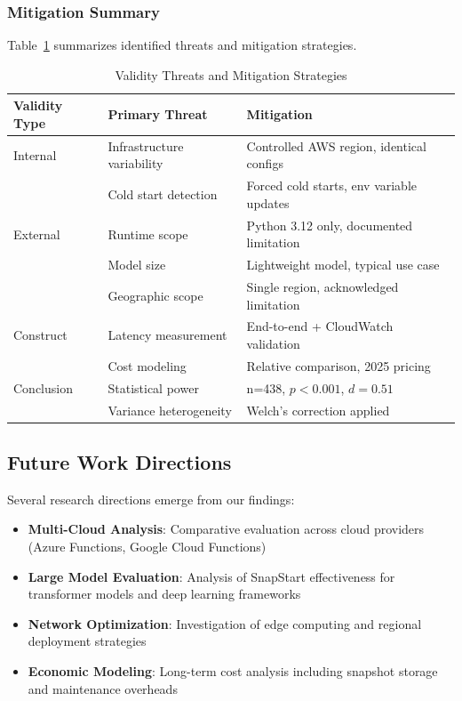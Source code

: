 \documentclass[conference]{IEEEtran}
\begin{document}
\subsubsection{Mitigation Summary}
Table~\ref{tab:validity_threats} summarizes identified threats and mitigation strategies.

\begin{table}[h]
\caption{Validity Threats and Mitigation Strategies}
\label{tab:validity_threats}
\centering
\small
\begin{tabular}{p{2cm}p{2.5cm}p{2cm}}
\toprule
\textbf{Validity Type} & \textbf{Primary Threat} & \textbf{Mitigation} \\
\midrule
Internal & Infrastructure variability & Controlled AWS region, identical configs \\
& Cold start detection & Forced cold starts, env variable updates \\
\midrule
External & Runtime scope & Python 3.12 only, documented limitation \\
& Model size & Lightweight model, typical use case \\
& Geographic scope & Single region, acknowledged limitation \\
\midrule
Construct & Latency measurement & End-to-end + CloudWatch validation \\
& Cost modeling & Relative comparison, 2025 pricing \\
\midrule
Conclusion & Statistical power & n=438, $p<0.001$, $d=0.51$ \\
& Variance heterogeneity & Welch's correction applied \\
\bottomrule
\end{tabular}
\end{table}

\subsection{Future Work Directions}
Several research directions emerge from our findings:

\begin{itemize}
\item \textbf{Multi-Cloud Analysis}: Comparative evaluation across cloud providers (Azure Functions, Google Cloud Functions)
\item \textbf{Large Model Evaluation}: Analysis of SnapStart effectiveness for transformer models and deep learning frameworks
\item \textbf{Network Optimization}: Investigation of edge computing and regional deployment strategies
\item \textbf{Economic Modeling}: Long-term cost analysis including snapshot storage and maintenance overheads
\end{itemize}
\end{document}
